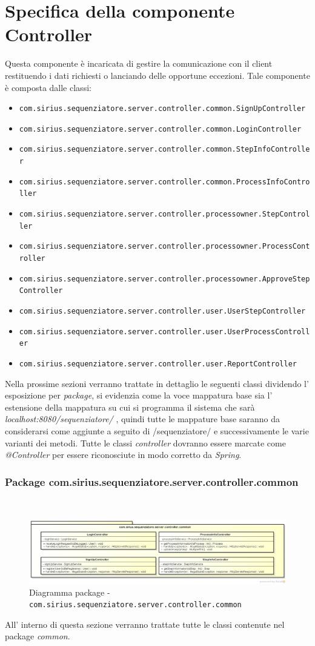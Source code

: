 \section{Specifica della componente Controller}
Questa componente è incaricata di gestire la comunicazione con il client restituendo i dati richiesti o lanciando delle opportune eccezioni.
Tale componente è composta dalle classi:
\begin{itemize}
	\item \texttt{com.sirius.sequenziatore.server.controller.common.SignUpController}
	\item \texttt{com.sirius.sequenziatore.server.controller.common.LoginController}
	\item \texttt{com.sirius.sequenziatore.server.controller.common.StepInfoController}
	\item \texttt{com.sirius.sequenziatore.server.controller.common.ProcessInfoController}
	\item \texttt{com.sirius.sequenziatore.server.controller.processowner.StepController}
	\item \texttt{com.sirius.sequenziatore.server.controller.processowner.ProcessController}
	\item \texttt{com.sirius.sequenziatore.server.controller.processowner.ApproveStepController}
	\item \texttt{com.sirius.sequenziatore.server.controller.user.UserStepController}
	\item \texttt{com.sirius.sequenziatore.server.controller.user.UserProcessController}
	\item \texttt{com.sirius.sequenziatore.server.controller.user.ReportController}
\end{itemize}
Nella prossime sezioni verranno trattate in dettaglio le seguenti classi dividendo l' esposizione per \textit{package}, si evidenzia come la voce mappatura base sia l' estensione della mappatura su cui si programma il sistema che sarà \textit{localhost:8080/sequenziatore/} , quindi tutte le mappature base saranno da considerarsi come aggiunte a seguito di /sequenziatore/ e successivamente le varie varianti dei metodi.
Tutte le classi \textit{controller} dovranno essere marcate come \textit{@Controller} per essere riconosciute in modo corretto da \textit{Spring}.
\subsubsection{Package com.sirius.sequenziatore.server.controller.common}
\
\begin{figure}[H] \centering \includegraphics[width=%
\textwidth]
{./classi/server/controllercommon.png} \caption{Diagramma package - \texttt{com.sirius.sequenziatore.server.controller.common}}
\end{figure}
All' interno di questa sezione verranno trattate tutte le classi contenute nel package \textit{common}.
